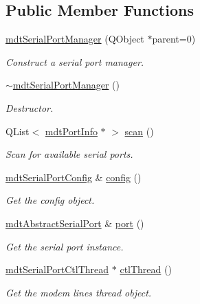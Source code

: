 \subsection*{Public Member Functions}
\begin{DoxyCompactItemize}
\item 
\hyperlink{classmdt_serial_port_manager_a6508372bcab37a73546fc2c24ee6415c}{mdt\-Serial\-Port\-Manager} (Q\-Object $\ast$parent=0)
\begin{DoxyCompactList}\small\item\em Construct a serial port manager. \end{DoxyCompactList}\item 
\hyperlink{classmdt_serial_port_manager_abde2c5990f3ec7daf41ebc35b4731c1d}{$\sim$mdt\-Serial\-Port\-Manager} ()
\begin{DoxyCompactList}\small\item\em Destructor. \end{DoxyCompactList}\item 
Q\-List$<$ \hyperlink{classmdt_port_info}{mdt\-Port\-Info} $\ast$ $>$ \hyperlink{classmdt_serial_port_manager_a791572f869d1d605d0c4658ca4187260}{scan} ()
\begin{DoxyCompactList}\small\item\em Scan for available serial ports. \end{DoxyCompactList}\item 
\hyperlink{classmdt_serial_port_config}{mdt\-Serial\-Port\-Config} \& \hyperlink{classmdt_serial_port_manager_a4b8ab7b9d53966a1887d9ce8557b8416}{config} ()
\begin{DoxyCompactList}\small\item\em Get the config object. \end{DoxyCompactList}\item 
\hyperlink{classmdt_abstract_serial_port}{mdt\-Abstract\-Serial\-Port} \& \hyperlink{classmdt_serial_port_manager_aa96937c2123fe4353b948b848d3e064d}{port} ()
\begin{DoxyCompactList}\small\item\em Get the serial port instance. \end{DoxyCompactList}\item 
\hyperlink{classmdt_serial_port_ctl_thread}{mdt\-Serial\-Port\-Ctl\-Thread} $\ast$ \hyperlink{classmdt_serial_port_manager_a9dc223afc96ec7b1fce4660ac96a3fe7}{ctl\-Thread} ()
\begin{DoxyCompactList}\small\item\em Get the modem lines thread object. \end{DoxyCompactList}\end{DoxyCompactItemize}
